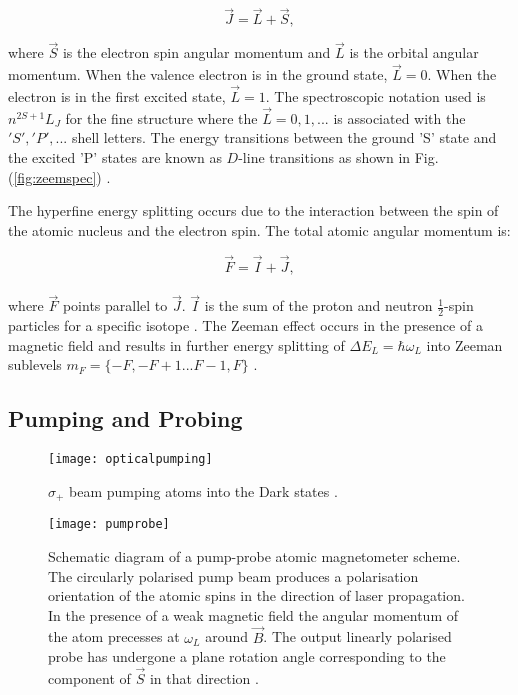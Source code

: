 \begin{equation}
\label{eq:interactionham0}
\vec{J}=\vec{L}+\vec{S}, 
\end{equation}


where $\vec{S}$ is the electron spin angular momentum and $\vec{L}$ is the orbital angular momentum. When the valence electron is in the ground state, $\vec{L} = 0$. When the electron is in the first excited state, $\vec{L}=1$. The spectroscopic notation used is $n^{2S+1}L_{J}$ for the fine structure where the $\vec{L} = 0, 1, ...$ is associated with the $'S','P',...$ shell letters. The energy transitions between the ground 'S' state and the excited 'P' states are known as $D$-line transitions as shown in Fig. (\ref{fig:zeemspec}) \citep{Foot2005AtomicPhysics,LandiDeglInnocenti2014AtomicProcesses}.  

The hyperfine energy splitting occurs due to the interaction between the spin of the atomic nucleus and the electron spin. The total atomic angular momentum is:

\begin{equation}
\label{eq:interactionham0}
\vec{F}=\vec{I}+\vec{J},
\end{equation}
\\
where $\vec{F}$ points parallel to $\vec{J}$. $\vec{I}$ is the sum of the proton and neutron $\frac{1}{2}$-spin particles for a specific isotope \citep{LandiDeglInnocenti2014AtomicProcesses}. The Zeeman effect occurs in the presence of a magnetic field and results in further energy splitting of $\Delta E_{L}=\hbar\omega_{L}$ into Zeeman sublevels $m_{F}=\{-F,-F+1 ... F-1,F\}$ \citep{Seltzer2008AtomicMagnetometery}. 

\subsection{Pumping and Probing} 

\begin{figure}[b]
\texttt{[image: opticalpumping]}
\caption{\label{fig:pumprobe} $\sigma_{+}$ beam pumping atoms into the Dark states \citep{Birzhandi2013EffectPhenomenon}.}
\end{figure}
 \begin{figure}[t]
\texttt{[image: pumprobe]}
\caption{\label{fig:opticalpumping} Schematic diagram of a pump-probe atomic magnetometer scheme. The circularly polarised pump beam produces a polarisation orientation of the atomic spins in the direction of laser propagation. In the presence of a weak magnetic field the angular momentum of the atom precesses at $\omega_{L}$ around $\vec{B}$. The output linearly polarised probe has undergone a plane rotation angle corresponding to the component of $\vec{S}$ in that direction \citep{Seltzer2008AtomicMagnetometery}.}
\end{figure}

